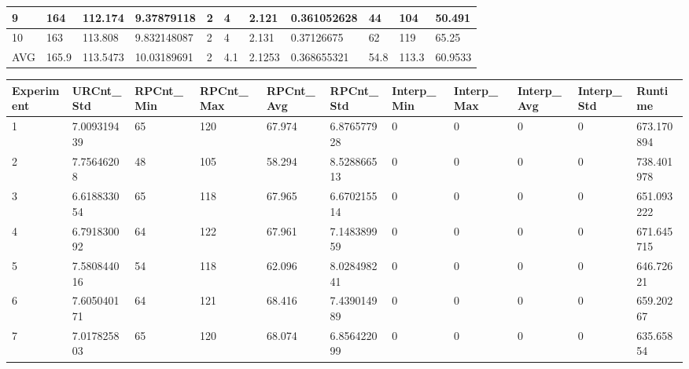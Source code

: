\begin{table}[H]
\begin{adjustbox}{max width=380pt,keepaspectratio,angle=90}
\begin{tabular}{|l|l|l|l|l|l|l|l|l|l|l|}
						9          & 164       & 112.174   & 9.37879118  & 2            & 4            & 2.121        & 0.361052628  & 44         & 104        & 50.491     \\ \hline
						10         & 163       & 113.808   & 9.832148087 & 2            & 4            & 2.131        & 0.37126675   & 62         & 119        & 65.25      \\ \hline\hline
						AVG        & 165.9     & 113.5473  & 10.03189691 & 2            & 4.1          & 2.1253       & 0.368655321  & 54.8       & 113.3      & 60.9533    \\ \hline
					\end{tabular}	
				\end{adjustbox}
				\begin{adjustbox}{max width=380pt,keepaspectratio,angle=90}
					\begin{tabular}{|l|l|l|l|l|l|l|l|l|l|l|}
						\rowcolor[HTML]{EFEFEF} 
						\hline
						Experiment & URCnt\_Std  & RPCnt\_Min & RPCnt\_Max & RPCnt\_Avg & RPCnt\_Std  & Interp\_Min & Interp\_Max & Interp\_Avg & Interp\_Std & Runtime     \\ \hline
						1          & 7.009319439 & 65         & 120        & 67.974     & 6.876577928 & 0           & 0           & 0           & 0           & 673.170894  \\ \hline
						2          & 7.75646208  & 48         & 105        & 58.294     & 8.528866513 & 0           & 0           & 0           & 0           & 738.401978  \\ \hline
						3          & 6.618833054 & 65         & 118        & 67.965     & 6.670215514 & 0           & 0           & 0           & 0           & 651.093222  \\ \hline
						4          & 6.791830092 & 64         & 122        & 67.961     & 7.148389959 & 0           & 0           & 0           & 0           & 671.645715  \\ \hline
						5          & 7.580844016 & 54         & 118        & 62.096     & 8.028498241 & 0           & 0           & 0           & 0           & 646.72621   \\ \hline
						6          & 7.605040171 & 64         & 121        & 68.416     & 7.439014989 & 0           & 0           & 0           & 0           & 659.20267   \\ \hline
						7          & 7.017825803 & 65         & 120        & 68.074     & 6.856422099 & 0           & 0           & 0           & 0           & 635.65854   \\ \hline

\end{tabular}
\end{adjustbox}
\end{table}
